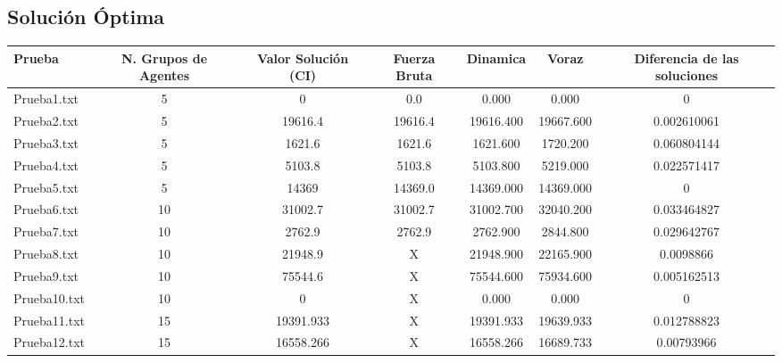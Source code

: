 \documentclass[11pt,letter]{article}
\begin{document}
    \subsection{Solución Óptima}

\begin{table}[H]
\centering
\begin{adjustbox}{width=\textwidth}
\begin{tabular}{|l|c|c|c|c|c|c|}
\hline
Prueba & N. Grupos de Agentes & Valor Solución (CI) & Fuerza Bruta & Dinamica & Voraz & Diferencia de las soluciones \\
\hline
Prueba1.txt & 5 & 0 & \cellcolor{verde}0.0 & \cellcolor{verde}0.000 & \cellcolor{verde}0.000 & 0 \\
\hline
Prueba2.txt & 5 & 19616.4 & \cellcolor{verde}19616.4 & \cellcolor{verde}19616.400 & \cellcolor{rosado}19667.600 & 0.002610061 \\
\hline
Prueba3.txt & 5 & 1621.6 & \cellcolor{verde}1621.6 & \cellcolor{verde}1621.600 & \cellcolor{rosado}1720.200 & 0.060804144 \\
\hline
Prueba4.txt & 5 & 5103.8 & \cellcolor{verde}5103.8 & \cellcolor{verde}5103.800 & \cellcolor{rosado}5219.000 & 0.022571417 \\
\hline
Prueba5.txt & 5 & 14369 & \cellcolor{verde}14369.0 & \cellcolor{verde}14369.000 & \cellcolor{verde}14369.000 & 0 \\
\hline
Prueba6.txt & 10 & 31002.7 & \cellcolor{verde}31002.7 & \cellcolor{verde}31002.700 & \cellcolor{rosado}32040.200 & 0.033464827 \\
\hline
Prueba7.txt & 10 & 2762.9 & \cellcolor{verde}2762.9 & \cellcolor{verde}2762.900 & \cellcolor{rosado}2844.800 & 0.029642767 \\
\hline
Prueba8.txt & 10 & 21948.9 & \cellcolor{rosado}X & \cellcolor{verde}21948.900 & \cellcolor{rosado}22165.900 & 0.0098866 \\
\hline
Prueba9.txt & 10 & 75544.6 & \cellcolor{rosado}X & \cellcolor{verde}75544.600 & \cellcolor{rosado}75934.600 & 0.005162513 \\
\hline
Prueba10.txt & 10 & 0 & \cellcolor{rosado}X & \cellcolor{verde}0.000 & \cellcolor{verde}0.000 & 0 \\
\hline
Prueba11.txt & 15 & 19391.933 & \cellcolor{rosado}X & \cellcolor{verde}19391.933 & \cellcolor{rosado}19639.933 & 0.012788823 \\
\hline
Prueba12.txt & 15 & 16558.266 & \cellcolor{rosado}X & \cellcolor{verde}16558.266 & \cellcolor{rosado}16689.733 & 0.00793966 \\

\end{tabular}
\end{adjustbox}
\end{table}
\end{document}

